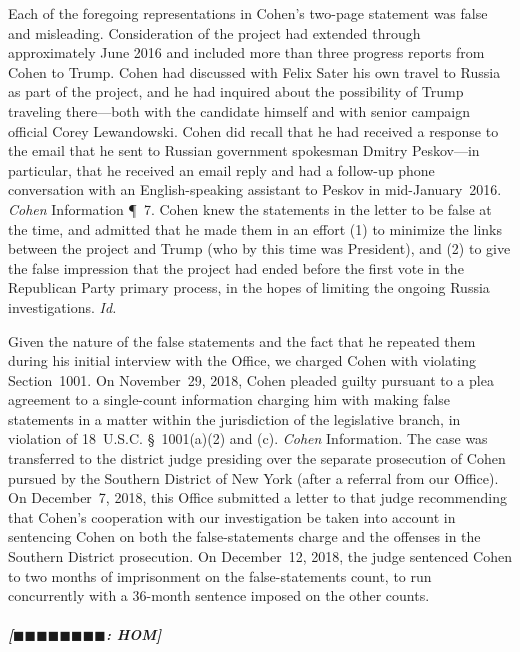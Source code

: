 Each of the foregoing representations in Cohen's two-page statement was false and misleading.
Consideration of the project had extended through approximately June 2016 and included more than three progress reports from Cohen to Trump.
Cohen had discussed with Felix Sater his own travel to Russia as part of the project, and he had inquired about the possibility of Trump traveling there---both with the candidate himself and with senior campaign official Corey Lewandowski.
Cohen did recall that he had received a response to the email that he sent to Russian government spokesman Dmitry Peskov---in particular, that he received an email reply and had a follow-up phone conversation with an English-speaking assistant to Peskov in mid-January~2016.
\textit{Cohen} Information \P~7.
Cohen knew the statements in the letter to be false at the time, and admitted that he made them in an effort (1) to minimize the links between the project and Trump (who by this time was President), and (2) to give the false impression that the project had ended before the first vote in the Republican Party primary process, in the hopes of limiting the ongoing Russia investigations.
\textit{Id.}

Given the nature of the false statements and the fact that he repeated them during his initial interview with the Office, we charged Cohen with violating Section~1001.
On November~29, 2018, Cohen pleaded guilty pursuant to a plea agreement to a single-count information charging him with making false statements in a matter within the jurisdiction of the legislative branch, in violation of 18~U.S.C. \S~1001(a)(2) and (c).
\textit{Cohen} Information.
The case was transferred to the district judge presiding over the separate prosecution of Cohen pursued by the Southern District of New York (after a referral from our Office).
On December~7, 2018, this Office submitted a letter to that judge recommending that Cohen's cooperation with our investigation be taken into account in sentencing Cohen on both the false-statements charge and the offenses in the Southern District prosecution.
On December~12, 2018, the judge sentenced Cohen to two months of imprisonment on the false-statements count, to run concurrently with a 36-month sentence imposed on the other counts.

\subparagraph{[$\blacksquare\blacksquare\blacksquare\blacksquare\blacksquare\blacksquare\blacksquare\blacksquare$: HOM]}


